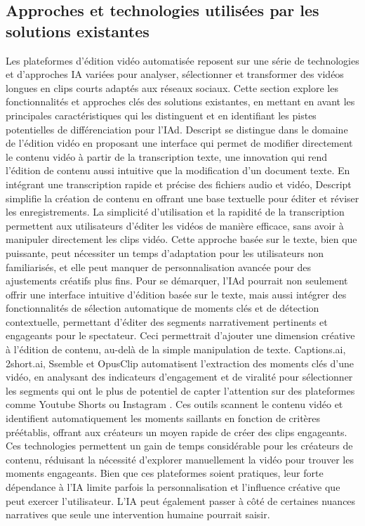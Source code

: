 \documentclass[livre]{udes-genie-these}
\begin{document}
\subsection{Approches et technologies utilisées par les solutions existantes}
Les plateformes d'édition vidéo automatisée reposent sur une série de technologies et d'approches IA variées pour analyser, sélectionner et transformer des vidéos longues en clips courts adaptés aux réseaux sociaux. Cette section explore les fonctionnalités et approches clés des solutions existantes, en mettant en avant les principales caractéristiques qui les distinguent et en identifiant les pistes potentielles de différenciation pour l'IAd.
Descript \cite{descript2024} se distingue dans le domaine de l'édition vidéo en proposant une interface qui permet de modifier directement le contenu vidéo à partir de la transcription texte, une innovation qui rend l'édition de contenu aussi intuitive que la modification d'un document texte. En intégrant une transcription rapide et précise des fichiers audio et vidéo, Descript simplifie la création de contenu en offrant une base textuelle pour éditer et réviser les enregistrements. La simplicité d'utilisation et la rapidité de la transcription permettent aux utilisateurs d'éditer les vidéos de manière efficace, sans avoir à manipuler directement les clips vidéo. Cette approche basée sur le texte, bien que puissante, peut nécessiter un temps d'adaptation pour les utilisateurs non familiarisés, et elle peut manquer de personnalisation avancée pour des ajustements créatifs plus fins.
Pour se démarquer, l'IAd pourrait non seulement offrir une interface intuitive d'édition basée sur le texte, mais aussi intégrer des fonctionnalités de sélection automatique de moments clés et de détection contextuelle, permettant d'éditer des segments narrativement pertinents et engageants pour le spectateur. Ceci permettrait d'ajouter une dimension créative à l'édition de contenu, au-delà de la simple manipulation de texte.
Captions.ai, 2short.ai, Ssemble et OpusClip automatisent l'extraction des moments clés d'une vidéo, en analysant des indicateurs d'engagement et de viralité pour sélectionner les segments qui ont le plus de potentiel de capter l'attention sur des plateformes comme Youtube Shorts ou Instagram \cite{captions2024}\cite{short2024}\cite{ssemble2024}\cite{opusclip2024}. Ces outils scannent le contenu vidéo et identifient automatiquement les moments saillants en fonction de critères préétablis, offrant aux créateurs un moyen rapide de créer des clips engageants. Ces technologies permettent un gain de temps considérable pour les créateurs de contenu, réduisant la nécessité d'explorer manuellement la vidéo pour trouver les moments engageants. Bien que ces plateformes soient pratiques, leur forte dépendance à l'IA limite parfois la personnalisation et l'influence créative que peut exercer l'utilisateur. L'IA peut également passer à côté de certaines nuances narratives que seule une intervention humaine pourrait saisir.
\end{document}
